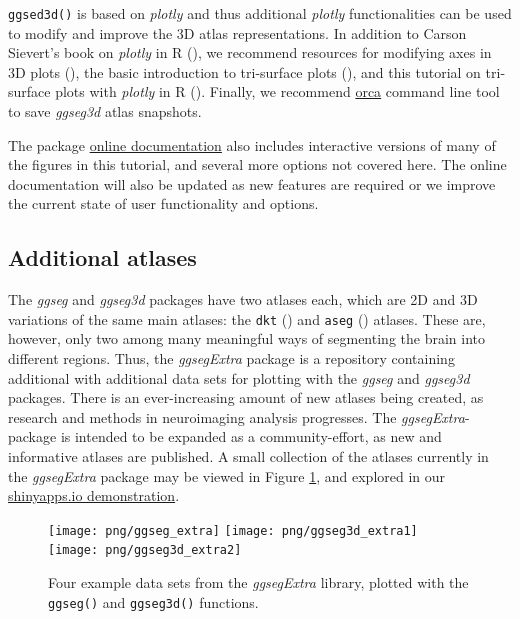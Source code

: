 \documentclass[fleqn,10pt]{wlpeerj} %
\begin{document}
\texttt{ggsed3d()} is based on \emph{plotly} and thus additional \emph{plotly} functionalities can be used to modify and improve the 3D atlas representations.
In addition to Carson Sievert's book on \emph{plotly} in R (\citeyearpar{plotly}), we recommend resources for modifying axes in 3D plots (\citet{plotly-ax}), the basic introduction to tri-surface plots (\citet{plotly-tri}), and this tutorial on tri-surface plots with \emph{plotly} in R (\citet{plotly-trisurf}).
Finally, we recommend \href{https://github.com/plotly/orca\#installation}{orca} command line tool to save \emph{ggseg3d} atlas snapshots.

The package \href{https://lcbc-uio.github.io/ggseg3d/articles/ggseg3d.html}{online documentation} also includes interactive versions of many of the figures in this tutorial, and several more options not covered here.
The online documentation will also be updated as new features are required or we improve the current state of user functionality and options.

\hypertarget{additional-atlases}{%
\subsection{Additional atlases}\label{additional-atlases}}

The \emph{ggseg} and \emph{ggseg3d} packages have two atlases each, which are 2D and 3D variations of the same main atlases: the \texttt{dkt} (\citet{dkt}) and \texttt{aseg} (\citet{aseg}) atlases.
These are, however, only two among many meaningful ways of segmenting the brain into different regions.
Thus, the \emph{ggsegExtra} package is a repository containing additional with additional data sets for plotting with the \emph{ggseg} and \emph{ggseg3d} packages.
There is an ever-increasing amount of new atlases being created, as research and methods in neuroimaging analysis progresses.
The \emph{ggsegExtra}-package is intended to be expanded as a community-effort, as new and informative atlases are published.
A small collection of the atlases currently in the \emph{ggsegExtra} package may be viewed in Figure \ref{fig:ggsegExtra}, and explored in our \href{https://athanasiamo.shinyapps.io/ggsegDemo/}{shinyapps.io demonstration}.



\begin{figure}[H]
\texttt{[image: png/ggseg\_extra]} \texttt{[image: png/ggseg3d\_extra1]} \texttt{[image: png/ggseg3d\_extra2]} \caption{Four example data sets from the \emph{ggsegExtra} library, plotted with the \texttt{ggseg()} and \texttt{ggseg3d()} functions.}\label{fig:ggsegExtra}
\end{figure}
\end{document}
